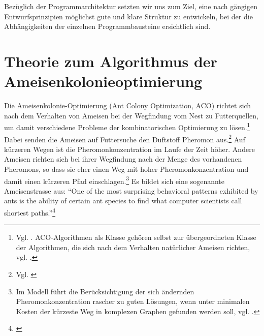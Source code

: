 Bezüglich der Programmarchitektur setzten wir uns zum Ziel, eine nach gängigen Entwurfsprinzipien möglichst gute und klare Struktur zu entwickeln, bei der die Abhängigkeiten der einzelnen Programmbausteine ersichtlich sind.



\section{Theorie zum Algorithmus der Ameisenkolonieoptimierung} 

Die Ameisenkolonie-Optimierung (Ant Colony Optimization, ACO) richtet sich nach dem Verhalten von Ameisen bei der Wegfindung vom Nest zu Futterquellen, um damit verschiedene Probleme der kombinatorischen Optimierung zu lösen.\footnote{Vgl. \cite[S. 1]{sch-koa}. ACO-Algorithmen als Klasse gehören selbst zur übergeordneten Klasse der Algorithmen, die sich nach dem Verhalten natürlicher Ameisen richten, vgl. \cite[S. 22]{ds-ant}.} Dabei senden die Ameisen auf Futtersuche den Duftstoff Pheromon aus.\footnote{Vgl. \cite[S. 1\,ff.]{ds-ant}} Auf kürzeren Wegen ist die Pheromonkonzentration im Laufe der Zeit höher. Andere Ameisen richten sich bei ihrer Wegfindung nach der Menge des vorhandenen Pheromons, so dass sie eher einen Weg mit hoher Pheromonkonzentration und damit einen kürzeren Pfad einschlagen.\footnote{Im Modell führt die Berücksichtigung der sich ändernden Pheromonkonzentration rascher zu guten Lösungen, wenn unter minimalen Kosten der kürzeste Weg in komplexen Graphen gefunden werden soll, vgl. \cite[S. 9\,ff.; 22]{ds-ant}.} Es bildet sich eine sogenannte Ameisenstrasse aus: \enquote{One of the most surprising behavioral patterns exhibited by ants is the ability of certain ant species to find what computer scientists call shortest paths.}\footnote{\cite[S. IX]{ds-ant}}

